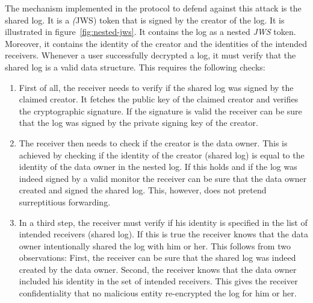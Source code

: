 \documentclass[../main.tex]{subfiles}
\begin{document}
The mechanism implemented in the protocol to defend against this attack is the shared log.
It is a \emph(JWS) token that is signed by the creator of the log.
It is illustrated in figure~\ref{fig:nested-jws}.
It contains the log as a nested \emph{JWS} token.
Moreover, it contains the identity of the creator and the identities of the intended receivers.
Whenever a user successfully decrypted a log, it must verify that the shared log is a valid data structure.
This requires the following checks:
\begin{enumerate}
\item 
First of all, the receiver needs to verify if the shared log was signed by the claimed creator.
It fetches the public key of the claimed creator and verifies the cryptographic signature.
If the signature is valid the receiver can be sure that the log was signed by the private signing key of the creator.
\item 
The receiver then needs to check if the creator is the data owner. 
This is achieved by checking if the identity of the creator (shared log) is equal to the identity of the data owner in the nested log.
If this holds and if the log was indeed signed by a valid monitor the receiver can be sure that the data owner created and signed the shared log.
This, however, does not pretend surreptitious forwarding.
\item 
In a third step, the receiver must verify if his identity is specified in the list of intended receivers (shared log).
If this is true the receiver knows that the data owner intentionally shared the log with him or her.
This follows from two observations:
First, the receiver can be sure that the shared log was indeed created by the data owner.
Second, the receiver knows that the data owner included his identity in the set of intended receivers.
This gives the receiver confidentiality that no malicious entity re-encrypted the log for him or her.
\end{enumerate}
\end{document}
